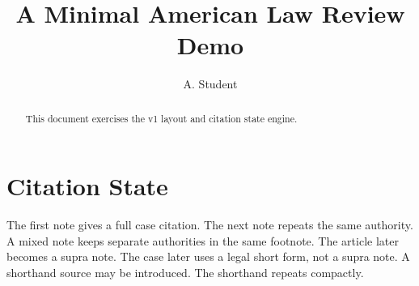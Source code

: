 \documentclass[review=generic,mode=submission]{americanlawreview}
\title{A Minimal American Law Review Demo}
\author{A. Student}
\begin{document}
\maketitle

\begin{abstract}
This document exercises the v1 layout and citation state engine.
\end{abstract}

\section{Citation State}

The first note gives a full case citation.
The next note repeats the same authority.
A mixed note keeps separate authorities in the same footnote.
The article later becomes a supra note.
The case later uses a legal short form, not a supra note.
A shorthand source may be introduced.
The shorthand repeats compactly.

\printbibliography
\end{document}
